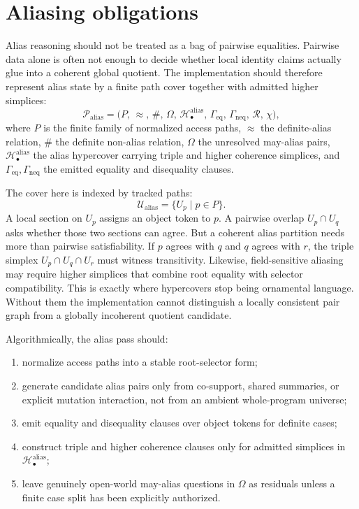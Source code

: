 \documentclass[11pt]{report}
\begin{document}
\section{Aliasing obligations}
Alias reasoning should not be treated as a bag of pairwise equalities. Pairwise data alone is often not enough to decide whether local identity claims actually glue into a coherent global quotient. The implementation should therefore represent alias state by a finite path cover together with admitted higher simplices:
\[
\mathcal{P}_{\mathrm{alias}}
=
\bigl(
P,\,
\approx,\,
\#,\,
\Omega,\,
\mathcal{H}^{\mathrm{alias}}_{\bullet},\,
\Gamma_{\mathrm{eq}},\,
\Gamma_{\mathrm{neq}},\,
\mathcal{R},\,
\chi
\bigr),
\]
where $P$ is the finite family of normalized access paths, $\approx$ the definite-alias relation, $\#$ the definite non-alias relation, $\Omega$ the unresolved may-alias pairs, $\mathcal{H}^{\mathrm{alias}}_{\bullet}$ the alias hypercover carrying triple and higher coherence simplices, and $\Gamma_{\mathrm{eq}},\Gamma_{\mathrm{neq}}$ the emitted equality and disequality clauses.

The cover here is indexed by tracked paths:
\[
\mathcal{U}_{\mathrm{alias}}
=
\{U_p \mid p \in P\}.
\]
A local section on $U_p$ assigns an object token to $p$. A pairwise overlap $U_p\cap U_q$ asks whether those two sections can agree. But a coherent alias partition needs more than pairwise satisfiability. If $p$ agrees with $q$ and $q$ agrees with $r$, the triple simplex $U_p\cap U_q\cap U_r$ must witness transitivity. Likewise, field-sensitive aliasing may require higher simplices that combine root equality with selector compatibility. This is exactly where hypercovers stop being ornamental language. Without them the implementation cannot distinguish a locally consistent pair graph from a globally incoherent quotient candidate.

Algorithmically, the alias pass should:
\begin{enumerate}
\item normalize access paths into a stable root-selector form;
\item generate candidate alias pairs only from co-support, shared summaries, or explicit mutation interaction, not from an ambient whole-program universe;
\item emit equality and disequality clauses over object tokens for definite cases;
\item construct triple and higher coherence clauses only for admitted simplices in $\mathcal{H}^{\mathrm{alias}}_{\bullet}$;
\item leave genuinely open-world may-alias questions in $\Omega$ as residuals unless a finite case split has been explicitly authorized.
\end{enumerate}
\end{document}
